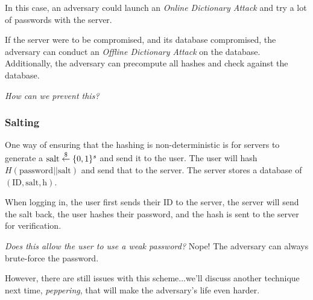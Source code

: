 
In this case, an adversary could launch an \emph{Online Dictionary Attack} and try a lot of passwords with the server.

If the server were to be compromised, and its database compromised, the adversary can conduct an \emph{Offline Dictionary Attack} on the database. Additionally, the adversary can precompute all hashes and check against the database.

\emph{How can we prevent this? }

\subsubsection{Salting}


One way of ensuring that the hashing is non-deterministic is for servers to generate a $\mathrm{salt}\overset{\$}{\leftarrow}\{0, 1\}^s$ and send it to the user. The user will hash $H(\mathrm{password}||\mathrm{salt})$ and send that to the server. The server stores a database of $(\mathrm{ID}, \mathrm{salt}, \mathrm{h})$.

When logging in, the user first sends their ID to the server, the server will send the salt back, the user hashes their password, and the hash is sent to the server for verification.

\emph{Does this allow the user to use a weak password?} Nope! The adversary can always brute-force the password.

However, there are still issues with this scheme...we'll discuss another technique next time, \emph{peppering}, that will make the adversary's life even harder.